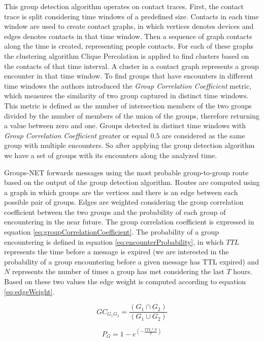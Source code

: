 This group detection algorithm operates on contact traces. First, the contact trace is split considering time windows of a predefined size. Contacts in each time window are used to create contact graphs, in which vertices denotes devices and edges denotes contacts in that time window. Then a sequence of graph contacts along the time is created, representing people contacts. For each of these graphs the clustering algorithm Clique Percolation \citep{derenyi2005clique} is applied to find clusters based on the contacts of that time interval. A cluster in a contact graph represents a group encounter in that time window. To find groups that have encounters in different time windows the authors introduced the \textit{Group Correlation Coefficient} metric, which measures the similarity of two group captured in distinct time windows. This metric is defined as the number of intersection members of the two groups divided by the number of members of the union of the groups, therefore returning a value between zero and one. Groups detected in distinct time windows with \textit{Group Correlation Coefficient} greater or equal $0.5$ are considered as the same group with multiple encounters. So after applying the group detection algorithm we have a set of groups with its encounters along the analyzed time.

Groups-NET forwards messages using the most probable group-to-group route based on the output of the group detection algorithm. Routes are computed using a graph in which groups are the vertices and there is an edge between each possible pair of groups. Edges are weighted considering the group correlation coefficient between the two groups and the probability of each group of encountering in the near future. The group correlation coefficient is expressed in equation \ref{eq:groupCorrelationCoefficient}. The probability of a group encountering is defined in equation \ref{eq:encounterProbability}, in which $TTL$ represents the time before a message is expired (we are interested in the probability of a group encountering before a given message has TTL expired) and $N$ represents the number of times a group has met considering the last $T$ hours. Based on these two values the edge weight is computed according to equation \ref{eq:edgeWeight}.

\begin{equation}
    \label{eq:groupCorrelationCoefficient}
    GC_{G_1G_2} = \frac{(G_1 \cap G_2)}{(G_1 \cup G_2)}
\end{equation}

\begin{equation}
    \label{eq:encounterProbability}
    P_G = 1 - e^{(-\frac{TTL * N}{T})}
\end{equation}

